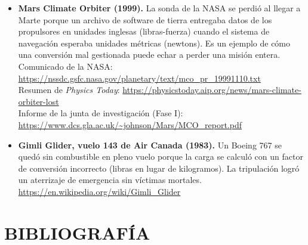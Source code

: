 \documentclass[12pt,a4paper]{article}
\begin{document}
\begin{itemize}
	\item \textbf{Mars Climate Orbiter (1999).} La sonda de la NASA se perdió al
	      llegar a Marte porque un archivo de software de tierra entregaba datos
	      de los
	      propulsores en unidades inglesas (libras-fuerza) cuando el sistema de
	      navegación
	      esperaba unidades métricas (newtons). Es un ejemplo de cómo una
	      conversión mal
	      gestionada puede echar a perder una misión entera. \\
	      Comunicado de la NASA:
	      \url{https://nssdc.gsfc.nasa.gov/planetary/text/mco_pr_19991110.txt} \\
	      Resumen de \emph{Physics Today}:
	      \url{https://physicstoday.aip.org/news/mars-climate-orbiter-lost} \\
	      Informe de la junta de investigación (Fase I):
	      \url{https://www.dcs.gla.ac.uk/~johnson/Mars/MCO_report.pdf}\\[-4pt]
	\item \textbf{Gimli Glider, vuelo 143 de Air Canada (1983).} Un Boeing 767
	      se quedó sin combustible en pleno vuelo porque la carga se calculó con
	      un factor
	      de conversión incorrecto (libras en lugar de kilogramos). La tripulación
	      logró
	      un aterrizaje de emergencia sin víctimas mortales. \\
	      \url{https://en.wikipedia.org/wiki/Gimli_Glider}
\end{itemize}

\section{BIBLIOGRAFÍA}
\end{document}
